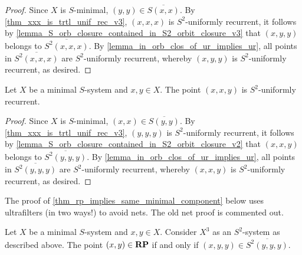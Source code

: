 \begin{proof}
\leanok{}
Since $X$ is $S$-minimal, $(y,y) \in \overline{S(x,x)}$. By \cref{thm_xxx_is_trtl_unif_rec_v3}, $(x,x,x)$ is $S^2$-uniformly recurrent, it follows by \cref{lemma_S_orb_closure_contained_in_S2_orbit_closure_v3} that $(x,y,y)$ belongs to $\overline{S^2(x,x,x)}$. By \cref{lemma_in_orb_clos_of_ur_implies_ur}, all points in $\overline{S^2(x,x,x)}$ are $S^2$-uniformly recurrent, whereby $(x,y,y)$ is $S^2$-uniformly recurrent, as desired.
\end{proof}

\begin{theorem}
\label{thm_xxy_is_trtl_unif_rec_v3}
\leanok{}
    Let $X$ be a minimal $S$-system and $x, y \in X$.  The point $(x,x,y)$ is $S^2$-uniformly recurrent.
\end{theorem}

\begin{proof}
\leanok{}
Since $X$ is $S$-minimal, $(x,x) \in \overline{S(y,y)}$. By \cref{thm_xxx_is_trtl_unif_rec_v3}, $(y,y,y)$ is $S^2$-uniformly recurrent, it follows by \cref{lemma_S_orb_closure_contained_in_S2_orbit_closure_v2} that $(x,x,y)$ belongs to $\overline{S^2(y,y,y)}$. By \cref{lemma_in_orb_clos_of_ur_implies_ur}, all points in $\overline{S^2(y,y,y)}$ are $S^2$-uniformly recurrent, whereby $(x,x,y)$ is $S^2$-uniformly recurrent, as desired.
\end{proof}

The proof of \cref{thm_rp_implies_same_minimal_component} below uses ultrafilters (in two ways!) to avoid nets.  The old net proof is commented out.


\begin{theorem}
\label{thm_rp_implies_same_minimal_component}
\label{theorem_cube_space_orbit_implies_rp}
\leanok{}
    Let $X$ be a minimal $S$-system and $x, y \in X$. Consider $X^3$ as an $S^2$-system as described above. The point $(x,y) \in \mathbf{RP}$ if and only if $(x,y,y) \in \overline{S^2(y,y,y)}$.
\end{theorem}

